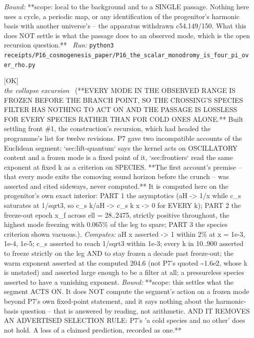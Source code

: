 \begin{description}
 \emph{Bound:} **scope: local to the background and to a SINGLE passage. Nothing here uses a cycle, a periodic map, or any identification of the progenitor's harmonic basis with another universe's -- the apparatus withdrawn c54.149/150. What this does NOT settle is what the passage does to an observed mode, which is the open recursion question.**
\ \emph{Run:} \texttt{python3 receipts/P16\_cosmogenesis\_paper/P16\_the\_scalar\_monodromy\_is\_four\_pi\_over\_rho.py}
\item[\rcptlabel{P16_every_mode_is_frozen_at_the_crossing}{P16R25}\textbf{P16R25}\quad\texttt{P16\_every\_mode\_is\_frozen\_at\_the\_crossing}]\hfill\textsf{[OK]}\\
\textit{the collapse excursion} \ (**EVERY MODE IN THE OBSERVED RANGE IS FROZEN BEFORE THE BRANCH POINT, SO THE CROSSING'S SPECIES FILTER HAS NOTHING TO ACT ON AND THE PASSAGE IS LOSSLESS FOR EVERY SPECIES RATHER THAN FOR COLD ONES ALONE.** Built settling front \#1, the construction's recursion, which had headed the programme's list for twelve revisions. P7 gave two incompatible accounts of the Euclidean segment: `sec:lift-quantum` says the kernel acts on OSCILLATORY content and a frozen mode is a fixed point of it, `sec:frontiers` read the same exponent at fixed k as a criterion on SPECIES. **The first account's premise -- that every mode exits the comoving sound horizon before the crunch -- was asserted and cited sideways, never computed.** It is computed here on the progenitor's own exact interior: PART 1 the asymptotics (\textbar{}aH\textbar{} -> 1/x while c\_s saturates at 1/sqrt3, so c\_s k/\textbar{}aH\textbar{} -> c\_s k x -> 0 for EVERY k); PART 2 the freeze-out epoch x\_f across ell = 28..2475, strictly positive throughout, the highest mode freezing with 0.065\% of the leg to spare; PART 3 the species criterion shown vacuous.). 
\emph{Computes:} \textbar{}aH\textbar{} x asserted -> 1 within 2\% at x = 1e-3, 1e-4, 1e-5; c\_s asserted to reach 1/sqrt3 within 1e-3; every k in 10..900 asserted to freeze strictly on the leg AND to stay frozen a decade past freeze-out; the warm exponent asserted at the computed 204.6 (not P7's quoted \textasciitilde{}1.6e2, whose k is unstated) and asserted large enough to be a filter at all; a pressureless species asserted to have a vanishing exponent.
 \emph{Bound:} **scope: this settles what the segment ACTS ON. It does NOT compute the segment's action on a frozen mode beyond P7's own fixed-point statement, and it says nothing about the harmonic-basis question -- that is answered by reading, not arithmetic. AND IT REMOVES AN ADVERTISED SELECTION RULE: P7's 'a cold species and no other' does not hold. A loss of a claimed prediction, recorded as one.**

\end{description}
